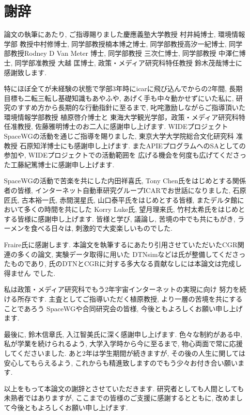 \chapter*{謝辞}
論文の執筆にあたり, ご指導賜りました慶應義塾大学教授 村井純博士, 環境情報学部
教授中村修博士, 同学部教授楠本博之博士, 同学部教授高汐一紀博士, 同学部教授Rodney
D Van Meter 博士, 同学部教授 三次仁博士, 同学部教授 中澤仁博士, 同学部准教授 大越
匡博士, 政策・メディア研究科特任教授 鈴木茂哉博士に感謝致します. 

特にほぼ全てが未経験の状態で学部3年時にicarに飛び込んでからの2年間, 
長期目標も二転三転し基礎知識もあやふや, あげく手も中々動かせずにいた私に, 
研究のすすめ方から長期的な行動指針に至るまで, 叱咤激励しながらご指導頂いた
環境情報学部教授 植原啓介博士と
東海大学観光学部，政策・メディア研究科特任准教授, 佐藤雅明博士のお二人に感謝申し上げます. 
WIDEプロジェクトSpaceWGの活動を通じご指導を賜りました, 
東京大学大学院総合文化研究科 准教授 石原知洋博士にも感謝申し上げます. 
またAPIEプログラムへのSAとしての参加や, WIDEプロジェクトでの活動範囲を
広げる機会を何度も広げてくださった工藤紀篤博士に感謝申し上げます. 

SpaceWGの活動で苦楽を共にした内田祥喜氏, Tony Chen氏をはじめとする関係者の皆様, 
インターネット自動車研究グループICARでお世話になりました, 
石原匠氏, 古本裕一氏, 赤間滉星氏, 山口泰平氏をはじめとする皆様, 
またデルタ館において多くの時間を共にした
Korry Luke氏, 望月理来氏, 竹村太希氏をはじめとする皆様に感謝申し上げます. 
皆様と学び, 議論し, 苦境の中でも共にもがき, ラーメンを食べる日々は, 刺激的で大変楽しいものでした. 

Fraire氏に感謝します. 本論文を執筆するにあたり引用させていただいたCGR関連の多くの論文, 実験データ取得に用いた
DTNsimなどは氏が整備してくださったものであり, 氏のDTNとCGRに対する多大なる貢献なしには本論文は完成し得ません
でした. 

私は政策・メディア研究科でもう2年宇宙インターネットの実現に向け
努力を続ける所存です. 主査としてご指導いただく植原教授, より一層の苦境を共にすることであろう
SpaceWGや合同研究会の皆様, 今後ともよろしくお願い申し上げます. 

最後に, 鈴木信章氏, 入江智美氏に深く感謝申し上げます. 色々な制約がある中, 
私が学業を続けられるよう, 大学入学時から今に至るまで, 物心両面で常に応援してくださいました. あと2年は学生期間が続きますが, 
その後の人生に関しては安心してもらえるよう, これからも精進致しますのでもう少々お付き合い願います. 

以上をもって本論文の謝辞とさせていただきます. 研究者としても人間としても未熟者ではありますが, 
ここまでの皆様のご支援に感謝するとともに, 改めまして今後ともよろしくお願い申し上げます. 


